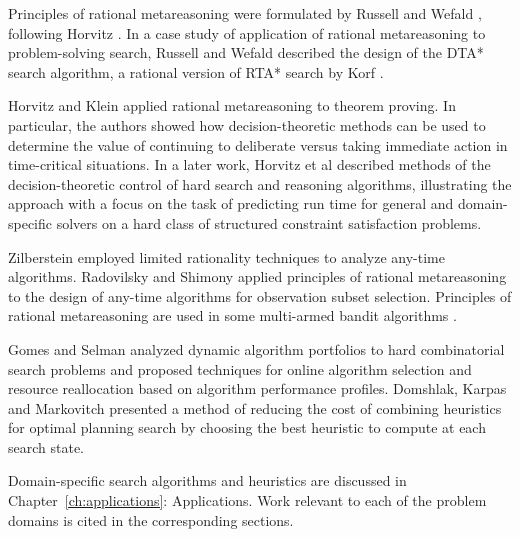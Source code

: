 Principles of rational metareasoning were formulated by Russell
and Wefald \cite{Russell.right}, following Horvitz
\cite{Horvitz.reasoningabout}. In a case study of application of rational
metareasoning to problem-solving search, Russell and Wefald
\cite{Russell.right} described the design of the DTA* search algorithm,
a rational version of RTA* search by Korf \cite{Korf.rta}. 

Horvitz and Klein \cite{Horvitz.proving} applied rational
metareasoning to theorem proving. In particular, the authors showed how
decision-theoretic methods can be used to determine the value of
continuing to deliberate versus taking immediate action in
time-critical situations. In a later work, Horvitz et al
\cite{Horvitz.bayesian} described methods of the
decision-theoretic control of hard search and
reasoning algorithms, illustrating the approach with a focus on the
task of predicting run time for general and domain-specific solvers on
a hard class of structured constraint satisfaction problems. 

Zilberstein \cite{Zilberstein.PHD} employed limited rationality
techniques to analyze any-time algorithms. Radovilsky and Shimony
\cite{Radovilsky.oss} applied principles of rational metareasoning to
the design of any-time algorithms for observation subset
selection. Principles of rational metareasoning are used in some
multi-armed bandit algorithms \cite{Vermorel.bandits}.

Gomes and Selman \cite{Gomes.portfolio} analyzed dynamic algorithm
portfolios to hard combinatorial search problems and proposed
techniques for online algorithm selection and resource reallocation
based on algorithm performance profiles. Domshlak, Karpas and
Markovitch \cite{Domshlak.combine} presented a method of reducing the
cost of combining heuristics for optimal planning search by choosing
the best heuristic to compute at each search state.

Domain-specific search algorithms and heuristics are discussed in 
Chapter~\ref{ch:applications}: Applications. Work relevant to each of
the problem domains is cited in the corresponding sections. 
